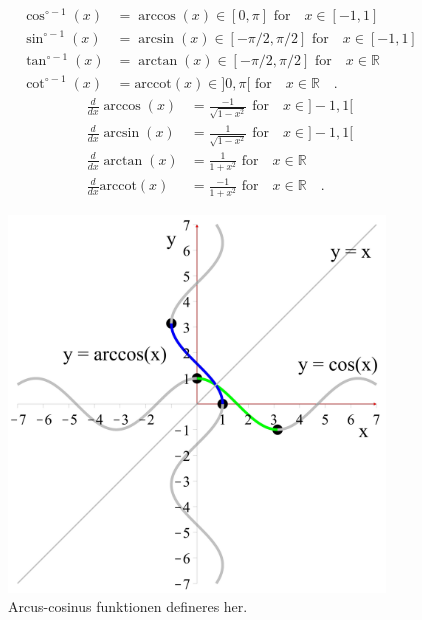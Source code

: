 \begin{equation}
\begin{aligned}
\cos^{\circ-1}(x) &= \arccos(x)  \in [0, \pi] \, \, \textrm{for} \quad x \in [-1, 1] \\
\sin^{\circ-1}(x) &= \arcsin(x)  \in [-\pi/2, \pi/2] \, \, \textrm{for} \quad x \in [-1, 1] \\
\tan^{\circ-1}(x) &= \arctan(x) \in [-\pi/2, \pi/2] \, \, \textrm{for} \quad x \in \mathbb{R} \\
\cot^{\circ-1}(x) &= \textrm{arccot}(x) \in ]0, \pi[ \, \, \textrm{for} \quad x \in \mathbb{R} \quad .
\end{aligned}
\end{equation}
\begin{equation}
\begin{aligned}
\frac{d}{dx}\arccos(x) &= \frac{-1}{\sqrt{1 - x^{2}}}\, \, \textrm{for} \quad x \in ]-1, 1[ \\
\frac{d}{dx}\arcsin(x) &= \frac{1}{\sqrt{1 - x^{2}}}\, \, \textrm{for} \quad x \in ]-1, 1[ \\
\frac{d}{dx}\arctan(x) &= \frac{1}{1+x^{2}}\, \, \textrm{for} \quad x \in \mathbb{R}\\
\frac{d}{dx}\textrm{arccot}(x) &= \frac{-1}{1+x^{2}} \, \, \textrm{for} \quad x \in \mathbb{R} \quad .
\end{aligned}
\end{equation}


\begin{figure}[h]
\centerline{\includegraphics[width=100mm]{FIGS/plotArccosSet.pdf}}
\begin{center}
\caption{Arcus-cosinus funktionen defineres her.} \label{tn14.figplotArccosSet}
\end{center}
\end{figure}



